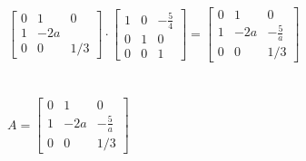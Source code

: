 \documentclass{article}
\begin{document}
\\
\\
\\
$\left[\begin{array}{ccc}0 & 1 & 0 \\ 1 & -2 a \\ 0 & 0 & 1 / 3\end{array}\right] \cdot\left[\begin{array}{ccc}1 & 0 & -\frac{5}{4} \\ 0 & 1 & 0 \\ 0 & 0 & 1\end{array}\right]=\left[\begin{array}{ccc}0 & 1 & 0 \\ 1 & -2 a & -\frac{5}{a} \\ 0 & 0 & 1 / 3\end{array}\right]$
\\
\\
\\
$A=\left[\begin{array}{ccc}0 & 1 & 0 \\ 1 & -2 a & -\frac{5}{a} \\ 0 & 0 & 1 / 3\end{array}\right]$
\end{document}
